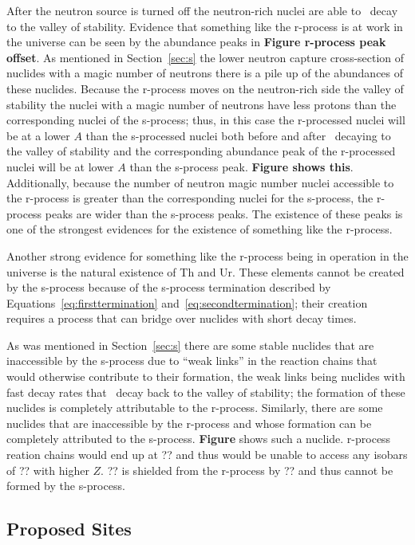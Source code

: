 After the neutron source is turned off the neutron-rich nuclei are
able to \bminus\ decay to the valley of stability.  Evidence that
something like the r-process is at work in the universe can be seen by
the abundance peaks in {\bf Figure r-process peak offset}.  As
mentioned in Section~\ref{sec:s} 
the lower neutron capture cross-section of nuclides with a magic
number of neutrons there is a pile up of the abundances of these
nuclides.   Because the r-process moves on the neutron-rich side
the valley of stability the nuclei with a magic number of neutrons
have less protons than the corresponding nuclei of the s-process;
thus, in this case the r-processed nuclei will be at a lower $A$ than the
s-processed nuclei both before and after \bminus\ decaying to the
valley of stability and the corresponding abundance peak of the
r-processed nuclei will be at lower $A$ than the s-process peak.  {\bf
Figure shows this}.  Additionally, because the number of neutron magic
number nuclei accessible to the r-process is greater than the
corresponding nuclei for the s-process, the r-process peaks are wider
than the s-process peaks.  The existence of these peaks is one of the
strongest evidences for the existence of something like the r-process.

Another strong evidence for something like the r-process being in
operation in the universe is the natural existence of Th and Ur.
These elements cannot be created by the s-process because of the
s-process termination described by Equations~\ref{eq:firsttermination}
and~\ref{eq:secondtermination}; their creation requires a process that
can bridge over nuclides with short decay times.

As was mentioned in Section~\ref{sec:s} there are some stable nuclides
that are inaccessible by the s-process due to ``weak links'' in the
reaction chains that would otherwise contribute to their formation,
the weak links being nuclides with fast decay rates that \bminus\
decay back to the valley of stability; the formation of these nuclides
is completely attributable to the r-process.  Similarly, there are
some nuclides that are inaccessible by the r-process and whose
formation can be completely attributed to the s-process.  {\bf Figure}
shows such a nuclide.  r-process reation chains would end up at ?? and
thus would be unable to access any isobars of ?? with higher $Z$.  ??
is shielded from the r-process by ?? and thus cannot be formed by the
s-process.


\subsection{Proposed Sites}
